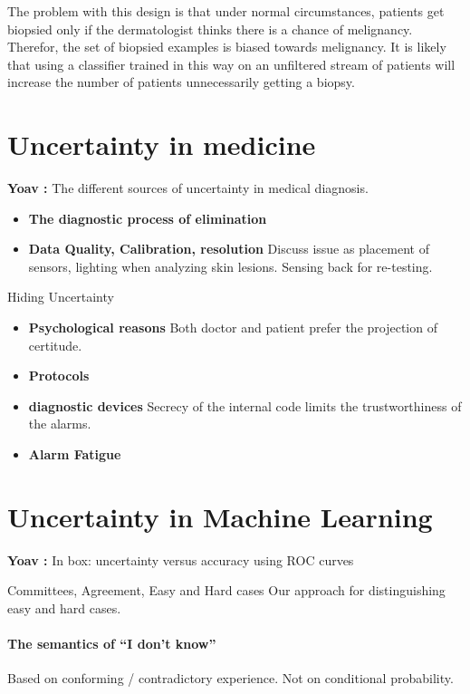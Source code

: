 \documentclass[10pt]{article}
\newcommand{\comment}[3]{{\color{#1} {\bf #2 :} #3}}
\newcommand{\yoav}[1]{\comment{red}{Yoav}{#1}}
\begin{document}
The problem with this design is that under normal circumstances, patients get
biopsied only if the dermatologist thinks there is a chance of
melignancy. Therefor, the set of biopsied examples is biased towards
melignancy. It is likely that using a classifier trained in this way
on an unfiltered stream of patients will increase the number of
patients unnecessarily getting a biopsy.

\section*{Uncertainty in medicine}

\yoav{The different sources of uncertainty in medical diagnosis.}

\begin{itemize}
  \item{\bf The diagnostic process of elimination}
  \item{\bf Data Quality, Calibration, resolution} Discuss issue as
    placement of sensors, lighting when analyzing skin lesions. Sensing back for re-testing.
  \end{itemize}

  Hiding Uncertainty
  \begin{itemize}
    \item {\bf Psychological reasons} Both doctor and patient prefer
      the projection of certitude.
    \item {\bf Protocols}
    \item {\bf diagnostic devices} Secrecy of the internal code limits
      the trustworthiness of the alarms.
    \item{\bf Alarm Fatigue}
  \end{itemize}
  

\section*{Uncertainty in Machine Learning}

\yoav{In box: uncertainty versus accuracy using ROC curves}
  
Committees, Agreement, Easy and Hard cases
Our approach for distinguishing easy and hard cases.

\paragraph*{The semantics of ``I don't know''}
Based on conforming / contradictory experience. Not on conditional
probability.
\end{document}
